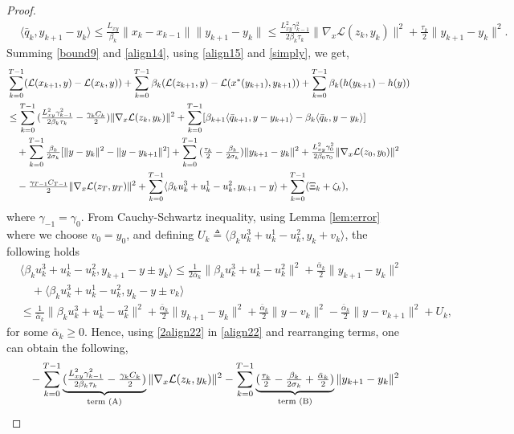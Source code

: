 \documentclass[letterpaper,11 pt]{article}
\def\ml{\mathcal L}
\newcommand{\zal}[1]{{\color{black}#1}}
\newcommand{\af}[1]{{\color{black}#1}}
\newcommand{\mb}[1]{{\color{black}#1}}
\newcommand{\az}[1]{{\color{black}#1}}
\begin{document}
\begin{proof}
\begin{align}\label{align15}
&\langle \bar q_k, y_{k+1}-y_k\rangle\leq \tfrac{L_{xy}}{ \beta_k}\|x_k-x_{k-1}\|\|y_{k+1}-y_k\|\leq \tfrac{L_{xy}^2\gamma_{k-1}^2}{2\beta_k\tau_k}\|\nabla_x\ml{(z_k,y_k)}\|^2+\tfrac{\tau_k}{2}\|y_{k+1}-y_k\|^2.
\end{align}
Summing \eqref{bound9} and \eqref{align14}, using \eqref{align15} and \eqref{simply}, we get,
\begin{align}\label{align22}
&\nonumber \sum_{k=0}^{T-1}(\ml(x_{k+1},y)-\ml(x_{k},y))+ \sum_{k=0}^{T-1}\beta_k(\ml(z_{k+1},y)-\ml(x^\ast\zal{(y_{k+1})},y_{k+1}))+\sum_{k=0}^{T-1}\beta_k(h(y_{k+1})-h(y))\\ \nonumber
&\leq \sum_{k=0}^{T-1}{(\tfrac{L_{xy}^2\gamma_{k-1}^2}{2{\beta_k}\tau_k}-\tfrac{\gamma_k C_k}{2})}\|\nabla_x\ml{(z_k,y_k)}\|^2+\sum_{k=0}^{T-1}[\beta_{k+1}\langle \bar q_{k+1},y-y_{k+1}\rangle-\beta_k\langle \bar q_k,y-y_k\rangle]\\
\nonumber& \quad+ \sum_{k=0}^{T-1}\tfrac{\beta_k}{ 2\sigma_k}[\|y-y_k\|^2-\|y-y_{k+1}\|^2]+\sum_{k=0}^{T-1}{(\tfrac{\az{\tau_k}}{2}-\tfrac{\beta_k}{{2\sigma_k}})}\|y_{k+1}-y_k\|^2+\tfrac{L_{xy}^2\gamma_0^2}{ 2\beta_0\tau_0}\|\nabla_x\ml{(z_0,y_0)}\|^2\\
&\quad-\tfrac{\gamma_{T-1}C_{T-1}}{ 2}\|\nabla_x \ml (z_{T},y_T)\|^2+\af{\sum_{k=0}^{T-1}\langle\beta_ku_k^3+u_k^1-u_k^2,y_{k+1}-y\rangle}+\mb{\sum_{k=0}^{T-1}(\Xi_k+\zeta_k)},
\end{align}
where $\gamma_{-1} = \gamma_0$. From Cauchy-Schwartz inequality, using Lemma \ref{lem:error} where we choose $v_0=y_0$, and defining $U_k\triangleq\langle \beta_ku_k^3+u_k^1-u_k^2,y_k+v_k\rangle$, the following holds
\begin{align}\label{2align22}
  \nonumber &\langle\beta_ku_k^3+u_k^1-u_k^2,y_{k+1}-y\pm y_k\rangle\leq \tfrac{1}{ 2\bar \alpha_k}\|\beta_ku_k^3+u_k^1-u_k^2\|^2+\tfrac{\bar \alpha_k}{ 2}\|y_{k+1}-y_k\|^2\\ \nonumber&\quad +\langle \beta_ku_k^3+u_k^1-u_k^2,y_{k}-y\pm v_k\rangle\\
   &\leq \tfrac{1}{ \bar \alpha_k}\|\beta_ku_k^3+u_k^1-u_k^2\|^2+\tfrac{\bar \alpha_k}{ 2}\|y_{k+1}-y_k\|^2+\tfrac{\bar \alpha_k}{ 2}\|y-v_k\|^2-\tfrac{\bar \alpha_k}{ 2}\|y-v_{k+1}\|^2+U_k,
\end{align}
for some $\bar \alpha_k\geq 0$. Hence, using \eqref{2align22} in \eqref{align22} and rearranging terms, one can obtain the following, 
\begin{align}\label{3align23}
  \nonumber &\quad -\sum_{k=0}^{T-1}\underbrace{(\tfrac{L_{xy}^2{\gamma^2_{k-1}}}{2{\beta_k}\tau_k}-\tfrac{\gamma_k C_k}{2})}_{\text{term (A)}}\|\nabla_x\ml{(z_k,y_k)}\|^2-\sum_{k=0}^{T-1}\underbrace{(\tfrac{\az{\tau_k}}{2}-\tfrac{\beta_k}{{2\sigma_k}}+\tfrac{\bar \alpha_k}{ 2})}_{\text{term (B)}}\|y_{k+1}-y_k\|^2\\

\end{align}
\end{proof}
\end{document}
